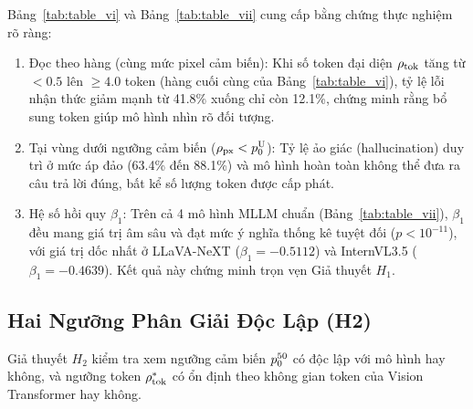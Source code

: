 Bảng~\ref{tab:table_vi} và Bảng~\ref{tab:table_vii} cung cấp bằng chứng thực nghiệm rõ ràng:
\begin{enumerate}
    \item Đọc theo hàng (cùng mức pixel cảm biến): Khi số token đại diện $\rho_{\mathrm{tok}}$ tăng từ $<0.5$ lên $\ge 4.0$ token (hàng cuối cùng của Bảng~\ref{tab:table_vi}), tỷ lệ lỗi nhận thức giảm mạnh từ 41.8\% xuống chỉ còn 12.1\%, chứng minh rằng bổ sung token giúp mô hình nhìn rõ đối tượng.
    \item Tại vùng dưới ngưỡng cảm biến ($\rho_{\mathrm{px}} < p_0^{\mathrm{U}}$): Tỷ lệ ảo giác (hallucination) duy trì ở mức áp đảo (63.4\% đến 88.1\%) và mô hình hoàn toàn không thể đưa ra câu trả lời đúng, bất kể số lượng token được cấp phát.
    \item Hệ số hồi quy $\beta_1$: Trên cả 4 mô hình MLLM chuẩn (Bảng~\ref{tab:table_vii}), $\beta_1$ đều mang giá trị âm sâu và đạt mức ý nghĩa thống kê tuyệt đối ($p < 10^{-11}$), với giá trị dốc nhất ở LLaVA-NeXT ($\beta_1 = -0.5112$) và InternVL3.5 ($\beta_1 = -0.4639$). Kết quả này chứng minh trọn vẹn Giả thuyết $H_1$.
\end{enumerate}

\subsection{Hai Ngưỡng Phân Giải Độc Lập (H2)}
Giả thuyết $H_2$ kiểm tra xem ngưỡng cảm biến $\pzero$ có độc lập với mô hình hay không, và ngưỡng token $\rhotokstar$ có ổn định theo không gian token của Vision Transformer hay không.

\begin{table}[t]
\centering
\caption{Hai ngưỡng phân giải thực nghiệm: Ngưỡng cảm biến $\pzero$ (pixel gốc) và Ngưỡng token $\rhotokstar$ (tokens).}
\label{tab:table_viii}
\end{table}

